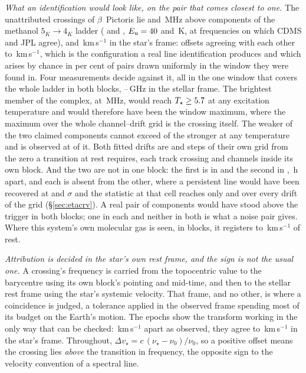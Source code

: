 \emph{What an identification would look like, on the pair that comes closest
to one.} The \ZmNCross{} unattributed crossings of $\beta$~Pictoris lie
\ZmOffLoMHz{} and \ZmOffHiMHz\,MHz above components of the methanol
$5_K\to4_K$ ladder (\ZmCompLo{} and \ZmCompHi, $E_{\rm u}=40$ and
\ZmEuHi\,K, at frequencies on which CDMS and JPL agree), \ZmDvLo{} and
\ZmDvHi\,km\,s$^{-1}$ in the star's frame: offsets agreeing with each other
to \ZmDvAgree\,km\,s$^{-1}$, which is the configuration a real line
identification produces and which arises by chance in \ZmChancePct{} per cent
of pairs drawn uniformly in the window they were found in. Four measurements
decide against it, all in the one window that covers the whole ladder in both
blocks, \ZmBandLo--\ZmBandHi\,GHz in the stellar frame. The brightest member of the complex, \ZmBright{} at
\ZmBrightMHz\,MHz, would reach $T_\star\ge5.7$ at any excitation
temperature and would therefore have been the window maximum, where the
maximum over the whole channel--drift grid is the crossing itself. The weaker
of the two claimed components cannot exceed \ZmRatioMax{} of the stronger at
any temperature and is observed at \ZmRatioObs{} of it. Both fitted drifts
are \ZmStepsOne{} and \ZmStepsTwo{} steps of their own grid from the zero a
transition at rest requires, each track crossing \ZmSweepOne{} and
\ZmSweepTwo{} channels inside its own block. And the two are not in one
block: the first is in \texttt{\ZmBlockOne} and the second in
\texttt{\ZmBlockTwo}, \ZmGapH\,h apart, and each is absent from the other,
where a persistent line would have been recovered at \ZmPersOne{} and
\ZmPersTwo$\sigma$ and the statistic at that cell reaches only \ZmAnyOne{}
and \ZmAnyTwo{} over every drift of the grid (\S\ref{sec:etacrv}). A real
pair of components would have stood above the trigger in both blocks; one in
each and neither in both is what a noise pair gives. Where this system's own molecular gas
is seen, in \ZmCoNBlock{} blocks, it registers to \ZmCoReg\,km\,s$^{-1}$ of
rest.

\emph{Attribution is decided in the star's own rest frame, and the sign is
not the usual one.} A crossing's frequency is carried from the topocentric
value to the barycentre using its own block's pointing and mid-time, and then
to the stellar rest frame using the star's systemic velocity. That frame, and
no other, is where a coincidence is judged, a tolerance applied in the
observed frame spending most of its budget on the Earth's motion. The
\FrEpochNEpoch{} \FrEpochStar{} epochs show the transform working in the only
way that can be checked: \FrEpochTopoKms\,km\,s$^{-1}$ apart as observed, they
agree to \FrEpochStelKms\,km\,s$^{-1}$ in the star's frame.
Throughout, $\Delta v_\star = c\,(\nu_\star-\nu_0)/\nu_0$, so a positive
offset means the crossing lies \emph{above} the transition
in frequency, the opposite sign to the velocity convention of a spectral line.

